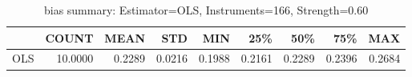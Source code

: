 \begin{table}[ht]
\centering
\caption{bias summary: Estimator=OLS, Instruments=166, Strength=0.60}
\begin{tabular}{lrrrrrrrr}
\toprule
 & COUNT & MEAN & STD & MIN & 25\% & 50\% & 75\% & MAX \\
\midrule
OLS & 10.0000 & 0.2289 & 0.0216 & 0.1988 & 0.2161 & 0.2289 & 0.2396 & 0.2684 \\
\bottomrule
\end{tabular}
\end{table}
